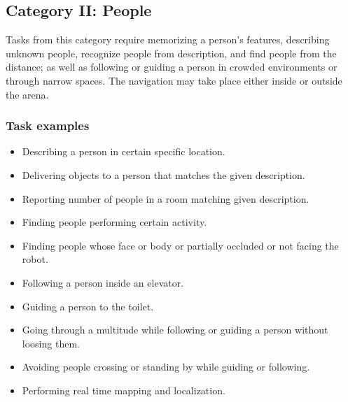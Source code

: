 %
%
\subsection{Category II: People}
\label{sec:eegpsr-category2-explained}
Tasks from this category require memorizing a person's features, describing unknown people, recognize people from description, and find people from the distance; as well as following or guiding a person in crowded environments or through narrow spaces. The navigation may take place either inside or outside the arena.

\subsubsection{Task examples}
\begin{itemize}
	\item Describing a person in certain specific location.
	\item Delivering objects to a person that matches the given description.
	\item Reporting number of people in a room matching given description.
	\item Finding people performing certain activity.
	\item Finding people whose face or body or partially occluded or not facing the robot.
	\item Following a person inside an elevator.
	\item Guiding a person to the toilet.
	\item Going through a multitude while following or guiding a person without loosing them.
	\item Avoiding people crossing or standing by while guiding or following.
	\item Performing real time mapping and localization.
\end{itemize}

